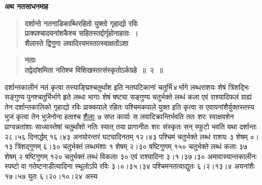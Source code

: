 \documentclass[11pt, openany]{book}
\begin{document}
{\small \textbf{अथ नतसाधनमाह\textendash }}

 \label{10.2.1}
\begin{quote}
{\large \textbf{{\color{purple}दर्शान्ते नतनाडिकाब्धिरहितो युक्तो गृहाद्यो रविः \\
प्राक्पश्चादयनांशकैश्च सहितस्तद्दोर्गृहोनाहताः~।\\
शैलास्ते द्विगुणा लवादिरयमस्तात्स्वाक्षतोंऽशा}}}
\end{quote}

\newpage

 \label{10.2}
\begin{quote}
{\large \textbf{{\color{purple}नताः\\
तद्वेदांशमिता नतिश्च विशिखस्तत्संस्कृतोऽर्कग्रहे~॥~२~॥}}}
\end{quote}

\begin{sloppypar}
दर्शान्तकालीनं नतं कृत्वा तस्याङ्घ्रिश्चतुर्थांश इति नतघटिकानां चतुर्भि\textendash \,४\textendash \,र्भागे लब्धराशयः शेषं त्रिंशद्भिः सङ्गुण्य पुनश्चतुर्भिर्भागे हृते लब्धा भागाः शेषं षष्ट्या सङ्गुण्य चतुर्भक्ते लब्धं कला एवं राश्यादिफलं ग्राह्यं तेन दर्शान्तकालिको गृहाद्यो रविः प्राक्कपाले रहितः पश्चिमकपाले युक्त इति कृत्वा स एवायनांशैर्युक्तस्तस्य भुजं कृत्वा तेन भुजेनोना हताश्च \hyperref[10.2.1]{शैलाः} ७ सप्त कार्याः स लवादिक्रान्तिर्भवति ततः शरः स्वाक्षवशेन प्राग्वन्नतांशाः साध्यास्तेषां चतुर्थांशो नतिः स्यात् तया प्रागानीतः शरः संस्कृतः सन् स्फुटो भवति यथा दर्शान्तः २८।५६ दिनार्द्धम् १६।४३ अनयोरन्तरं घट्यादिनतम् १२।४३ पश्चिमं चतुर्भक्ते लब्धं राशयः ३ शेषम् ०।१३ त्रिंशद्गुणम् ६।३० चतुर्भक्तं लब्धमंशाः १ शेषम् २।३० षष्टिगुणम् १५० चतुर्भक्ते लब्धं कलाः ३७ शेषम् २ षष्टिगुणम् १२० चतुर्भक्तं लब्धं विकलाः ३० एवं राश्यादिना ३।१।३७।३० अमावास्यान्तकालीनः स्पष्टो वा गतेष्टनाडीत्यादिना स्थूलोऽपि रविः ३।०।३५।३४ पश्चिमनतत्वाद्युतः ६।२।१३।४ अयनांशैः १७।५७ युतः ६।२०।१०।२४ अस्य
\end{sloppypar}

\newpage
\end{document}
